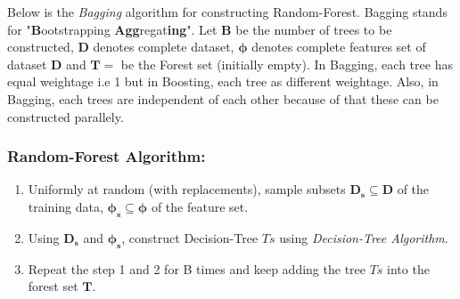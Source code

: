 \documentclass[twoside]{iitbreport}
\begin{document}
Below is the \textit{Bagging} algorithm for constructing Random-Forest. Bagging stands for "\textbf{B}ootstrapping \textbf{Agg}regat\textbf{ing}".  Let \textbf{B} be the number of trees to be constructed, \textbf{D} denotes complete dataset, $\boldsymbol{\phi}$ denotes complete features set of dataset \textbf{D} and $\boldsymbol{T}={}$ be the Forest set (initially empty).  In Bagging, each tree has equal weightage i.e 1 but in Boosting, each tree as different weightage. Also, in Bagging, each trees are independent of each other because of that these can be constructed parallely.

\subsubsection{Random-Forest Algorithm:} \label{subsec: Random-Forest}
\begin{enumerate}
  \item Uniformly at random (with replacements), sample subsets $\boldsymbol{D_s} \subseteq \boldsymbol{D}$ of the training data, $\boldsymbol{\phi_s} \subseteq \boldsymbol{\phi}$ of the feature set. 
  \item  Using $\boldsymbol{D_s}$ and $\boldsymbol{\phi_s}$, construct Decision-Tree $Ts$ using \textit{Decision-Tree Algorithm}.
  \item Repeat the step 1 and 2 for B times and keep adding the tree $Ts$ into the forest set $\boldsymbol{T}$.
\end{enumerate}
\end{document}
